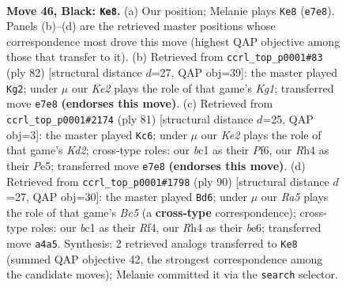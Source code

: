 \documentclass[11pt]{article}
\begin{document}
\clearpage

\begin{figure}[p]\centering
\begin{subfigure}{0.46\textwidth}\centering
\resizebox{\linewidth}{!}{%
\newchessgame
\chessboard[
  setfen={8/4k3/1pR3p1/6p1/rp1P3r/3K4/8/2B5 b - - 2 46},
  showmover=false,
  pgfstyle=straightmove, color=movearrow, markmove={e7-e8}
]}
\caption{}
\end{subfigure}\hfill
\begin{subfigure}{0.46\textwidth}\centering
\resizebox{\linewidth}{!}{%
\newchessgame
\chessboard[
  setfen={8/8/1p6/6k1/R6p/1P6/Pr3P2/6K1 w - - 0 42},
  showmover=false,
  pgfstyle=straightmove, color=movearrow, markmove={g1-g2}
]}
\caption{}
\end{subfigure}
\\[4pt]
\begin{subfigure}{0.46\textwidth}\centering
\resizebox{\linewidth}{!}{%
\newchessgame
\chessboard[
  setfen={8/1R1k4/5p2/4p3/7p/3P1r1P/2r5/3RB2K b - - 1 41},
  showmover=false,
  pgfstyle=straightmove, color=movearrow, markmove={d7-c6}
]}
\caption{}
\end{subfigure}\hfill
\begin{subfigure}{0.46\textwidth}\centering
\resizebox{\linewidth}{!}{%
\newchessgame
\chessboard[
  setfen={8/5p1k/p3b3/2B5/2P2R2/1P4P1/1r4P1/5K2 w - - 1 46},
  showmover=false,
  pgfstyle=straightmove, color=movearrow, markmove={c5-d6}
]}
\caption{}
\end{subfigure}
\caption{\textbf{Move 46, Black: \texttt{Ke8}.} (a) Our position; Melanie plays \texttt{Ke8} (\texttt{e7e8}). Panels (b)--(d) are the retrieved master positions whose correspondence most drove this move (highest QAP objective among those that transfer to it). (b) Retrieved from \texttt{ccrl\_top\_p0001\#83} (ply 82) [structural distance $d$=27, QAP obj=39]: the master played \texttt{Kg2}; under $\mu$ our \emph{Ke2} plays the role of that game's \emph{Kg1}; transferred move \texttt{e7e8} \textbf{(endorses this move)}. (c) Retrieved from \texttt{ccrl\_top\_p0001\#2174} (ply 81) [structural distance $d$=25, QAP obj=3]: the master played \texttt{Kc6}; under $\mu$ our \emph{Ke2} plays the role of that game's \emph{Kd2}; cross-type roles: our \emph{b}c1 as their \emph{P}f6, our \emph{R}h4 as their \emph{P}e5; transferred move \texttt{e7e8} \textbf{(endorses this move)}. (d) Retrieved from \texttt{ccrl\_top\_p0001\#1798} (ply 90) [structural distance $d$=27, QAP obj=30]: the master played \texttt{Bd6}; under $\mu$ our \emph{Ra5} plays the role of that game's \emph{Bc5} (a \textbf{cross-type} correspondence); cross-type roles: our \emph{b}c1 as their \emph{R}f4, our \emph{R}h4 as their \emph{b}e6; transferred move \texttt{a4a5}. Synthesis: 2 retrieved analogs transferred to \texttt{Ke8} (summed QAP objective 42, the strongest correspondence among the candidate moves); Melanie committed it via the \texttt{search} selector.}
\label{fig:thought-m91}
\end{figure}
\end{document}
